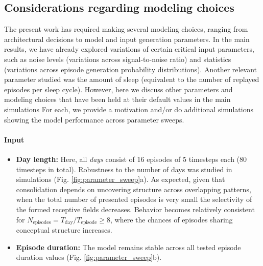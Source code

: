 \documentclass{article}
\begin{document}
\subsection*{Considerations regarding modeling choices}
The present work has required making several modeling choices, ranging from architectural decisions to model and input generation parameters. In the main results, we have already explored variations of certain critical input parameters, such as noise levels (variations across signal-to-noise ratio) and statistics (variations across episode generation probability distributions). Another relevant parameter studied was the amount of sleep (equivalent to the number of replayed episodes per sleep cycle). However, here we discuss other parameters and modeling choices that have been held at their default values in the main simulations For each, we provide a motivation and/or do additional simulations showing the model performance across parameter sweeps.
\paragraph*{Input}
\begin{itemize}
    \item \textbf{Day length: }Here, all \textit{days} consist of 16 episodes of 5 timesteps each (80 timesteps in total). Robustness to the number of days was studied in simulations (Fig. \ref{fig:parameter_sweep}a). As expected, given that consolidation depends on uncovering structure across overlapping patterns, when the total number of presented episodes is very small the selectivity of the formed receptive fields decreases. Behavior becomes relatively consistent for $N_\textrm{episodes} = T_\textrm{day}/T_\textrm{episode} \geq 8$, where the chances of episodes sharing conceptual structure increases.
    \item \textbf{Episode duration:} The model remains stable across all tested episode duration values (Fig. \ref{fig:parameter_sweep}b).
\end{itemize}
\end{document}
